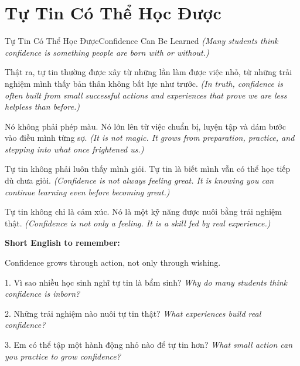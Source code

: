 \section{Tự Tin Có Thể Học Được}
\begin{truyen}{Tự Tin Có Thể Học Được}{Confidence Can Be Learned}
\textit{(Many students think confidence is something people are born with or without.)}

Thật ra, tự tin thường được xây từ những lần làm được việc nhỏ, từ những trải nghiệm mình thấy bản thân không bất lực như trước.
\textit{(In truth, confidence is often built from small successful actions and experiences that prove we are less helpless than before.)}

Nó không phải phép màu. Nó lớn lên từ việc chuẩn bị, luyện tập và dám bước vào điều mình từng sợ.
\textit{(It is not magic. It grows from preparation, practice, and stepping into what once frightened us.)}

Tự tin không phải luôn thấy mình giỏi. Tự tin là biết mình vẫn có thể học tiếp dù chưa giỏi.
\textit{(Confidence is not always feeling great. It is knowing you can continue learning even before becoming great.)}
\end{truyen}

\begin{baihoc}
Tự tin không chỉ là cảm xúc. Nó là một kỹ năng được nuôi bằng trải nghiệm thật.
\textit{(Confidence is not only a feeling. It is a skill fed by real experience.)}
\end{baihoc}

\begin{ghinhoanh}
\textbf{Short English to remember:}

Confidence grows through action, not only through wishing.

\end{ghinhoanh}

\begin{tuhocnhanh}
1. Vì sao nhiều học sinh nghĩ tự tin là bẩm sinh? \textit{Why do many students think confidence is inborn?}

2. Những trải nghiệm nào nuôi tự tin thật? \textit{What experiences build real confidence?}

3. Em có thể tập một hành động nhỏ nào để tự tin hơn? \textit{What small action can you practice to grow confidence?}
\end{tuhocnhanh}
\ngancach

